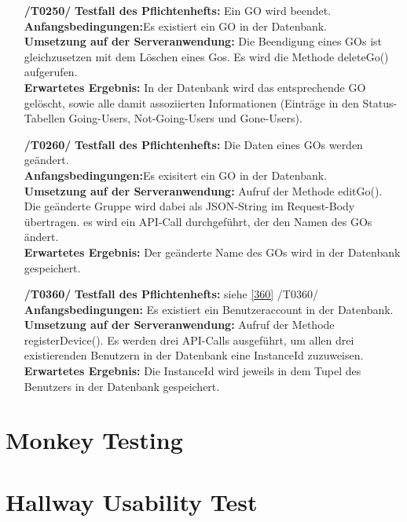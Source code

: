 \documentclass[11pt,a4paper]{scrartcl}
\begin{document}
\begin{enumerate}
	\item[\textbf{/T0250/}]
	\textbf{Testfall des Pflichtenhefts: }Ein GO wird beendet.\\
	\textbf{Anfangsbedingungen:}Es existiert ein GO in der Datenbank.\\
	\textbf{Umsetzung auf der Serveranwendung: }Die Beendigung eines GOs ist gleichzusetzen mit dem Löschen eines Gos. Es wird die Methode deleteGo() aufgerufen.\\
	\textbf{Erwartetes Ergebnis: }In der Datenbank wird das entsprechende GO gelöscht, sowie alle damit assoziierten Informationen (Einträge in den Status-Tabellen Going-Users, Not-Going-Users und Gone-Users).
	
	\item[\textbf{/T0260/}]
	\textbf{Testfall des Pflichtenhefts: }Die Daten eines GOs werden geändert.\\
	\textbf{Anfangsbedingungen:}Es exisitert ein GO in der Datenbank.\\
	\textbf{Umsetzung auf der Serveranwendung: }Aufruf der Methode editGo(). Die geänderte Gruppe wird dabei als JSON-String im Request-Body übertragen. es wird ein API-Call durchgeführt, der den Namen des GOs ändert.\\
	\textbf{Erwartetes Ergebnis: }Der geänderte Name des GOs wird in der Datenbank gespeichert.
	
	\item[\textbf{/T0360/}]
	\textbf{Testfall des Pflichtenhefts: }siehe \ref{360} /T0360/\\
	\textbf{Anfangsbedingungen:} Es existiert ein Benutzeraccount in der Datenbank.\\
	\textbf{Umsetzung auf der Serveranwendung: }Aufruf der Methode registerDevice(). Es werden drei API-Calls ausgeführt, um allen drei existierenden Benutzern in der Datenbank eine InstanceId zuzuweisen.\\
	\textbf{Erwartetes Ergebnis: }Die InstanceId wird jeweils in dem Tupel des Benutzers in der Datenbank gespeichert.
	
\end{enumerate}

\newpage

\section{Monkey Testing}

\section{Hallway Usability Test}
\end{document}
